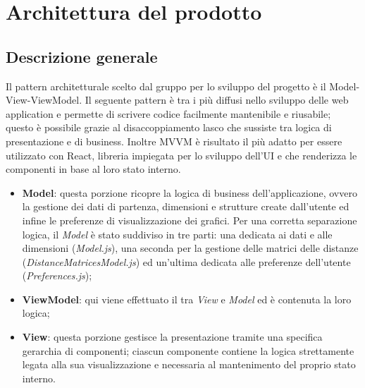 \section{Architettura del prodotto}
\subsection{Descrizione generale}
Il pattern architetturale scelto dal gruppo per lo sviluppo del progetto è il Model-View-ViewModel. Il seguente pattern è tra i più diffusi nello sviluppo delle web application e permette di scrivere codice facilmente mantenibile e riusabile; questo è possibile grazie al disaccoppiamento lasco che sussiste tra logica di presentazione e di business. Inoltre MVVM è risultato il più adatto per essere utilizzato con React, libreria impiegata per lo sviluppo dell’UI e che renderizza le componenti in base al loro stato interno.
\begin{itemize}
\item \textbf{Model}: questa porzione ricopre la logica di business dell’applicazione, ovvero la gestione dei dati di partenza, dimensioni e strutture create dall’utente ed infine le preferenze di visualizzazione dei grafici. Per una corretta separazione logica, il \textit{Model} è stato suddiviso in tre parti: una dedicata ai dati e alle dimensioni (\textit{Model.js}), una seconda per la gestione delle matrici delle distanze (\textit{DistanceMatricesModel.js}) ed un’ultima dedicata alle preferenze dell’utente (\textit{Preferences.js});

\item \textbf{ViewModel}: qui viene effettuato il  tra \textit{View} e \textit{Model} ed è contenuta la loro logica;

\item \textbf{View}: questa porzione gestisce la presentazione tramite una specifica gerarchia di componenti; ciascun componente contiene la logica strettamente legata alla sua visualizzazione e necessaria al mantenimento del proprio stato interno.
\end{itemize}

